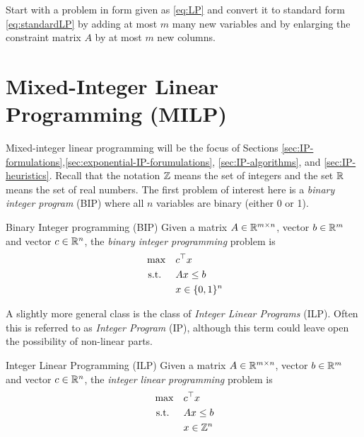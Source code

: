 \documentclass[../open-optimization/open-optimization.tex]{subfiles}
\begin{document}


\begin{exercise}
\label{exercise:LPconversion}
Start with a problem in form given as \eqref{eq:LP} and convert it to standard form \eqref{eq:standardLP} by adding at most $m$ many new variables and by enlarging the constraint matrix $A$ by at most $m$ new columns.
\end{exercise}
\section{Mixed-Integer Linear Programming (MILP)}
Mixed-integer linear programming will be the focus of Sections \ref{sec:IP-formulations},\ref{sec:exponential-IP-forumulations}, \ref{sec:IP-algorithms}, and \ref{sec:IP-heuristics}.
Recall that the notation ${\mathbb{Z}}$ means the set of integers and the set ${\mathbb{R}}$ means the set of real numbers.  The first problem of interest here is a \emph{binary integer program} (BIP) where all $n$ variables are binary (either 0 or 1).

\begin{general}{Binary Integer programming (BIP)}{\npcomplete}
Given a matrix $A \in {\mathbb{R}}^{m\times n}$, vector $b \in {\mathbb{R}}^m$ and vector $c \in {\mathbb{R}}^n$, the \emph{binary integer programming} problem is
\begin{equation}
\label{eq:BIP}
\begin{split}
\max \quad & c^\top x\\
\text{ s.t. }  \quad & Ax \leq b\\
& x \in \{0,1\}^n
\end{split}
\end{equation}
\end{general}
A slightly more general class is the class of \emph{Integer Linear Programs} (ILP).  Often this is referred to as \emph{Integer Program} (IP), although this term could leave open the possibility of non-linear parts.



\begin{general}{Integer Linear Programming (ILP)}{\npcomplete}
Given a matrix $A \in {\mathbb{R}}^{m\times n}$, vector $b \in {\mathbb{R}}^m$ and vector $c \in {\mathbb{R}}^n$, the \emph{integer linear programming} problem is
\begin{equation}
\label{eq:ILP}
\begin{split}
\max \quad & c^\top x\\
\text{ s.t. }  \quad & Ax \leq b\\
& x \in {\mathbb{Z}}^n
\end{split}
\end{equation}
\end{general}
\end{document}
